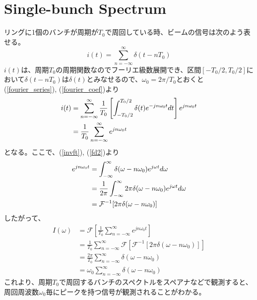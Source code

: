 \documentclass[]{jlreq}
\theoremstyle{definition}
\begin{document}
\section{Single-bunch Spectrum}
リングに1個のバンチが周期が$T_0$で周回している時、ビームの信号は次のよう表せる。
%
\begin{equation}
  i(t) = \sum_{n=-\infty}^{\infty} \delta (t - n T_0 )
\end{equation}
%
$i(t)$は、周期$T_0$の周期関数なのでフーリエ級数展開でき、区間$[-T_0/2, T_0/2]$において$\delta(t- n T_0)$は$\delta(t)$とみなせるので、$\omega_0 = 2\pi/T_0$とおくと(\ref{fourier_series}), (\ref{fourier_coef})より
%
\begin{align}
  i(t) &= \sum_{n = -\infty}^{\infty} \frac{1}{T_0} \left[\int_{-T_0/2}^{T_0/2}\delta (t) e^{-j n \omega_0 t} dt\right] 
  e^{j n \omega_0 t} \notag\\
              &= \frac{1}{T_0} \sum_{n = -\infty}^{\infty} e^{j n \omega_0 t} 
\end{align}
%
となる。ここで、(\ref{invft}), (\ref{fd2})より
%
\begin{align}
  e^{j n \omega_0 t} &=  \int_{-\infty}^{\infty} \delta (\omega - n \omega_0) e^{j \omega t} d\omega \notag\\ 
      &= \frac{1}{2\pi} \int_{-\infty}^{\infty} 2\pi \delta (\omega - n \omega_0) e^{j \omega t} d\omega \\ 
      &= \mathcal{F}^{-1}[2\pi \delta(\omega - n\omega_0)] 
\end{align}
%
したがって、
%
\begin{align}
  I(\omega) &= \mathcal{F}\left[\frac{1}{T_0} \sum_{n = -\infty}^{\infty} e^{j n \omega_0 t}\right] \\ 
      & = \frac{1}{T_0} \sum_{n = -\infty}^{\infty} \mathcal{F}[\mathcal{F}^{-1}[2\pi \delta(\omega - n\omega_0)]] \\ 
      & = \frac{2 \pi}{T_0} \sum_{n = -\infty}^{\infty} \delta(\omega - n\omega_0)\\ 
      &= \omega_0 \sum_{n = -\infty}^{\infty} \delta(\omega - n\omega_0)
\end{align}
%
これより、周期$T_0$で周回するバンチのスペクトルをスペアナなどで観測すると、周回周波数$\omega_0$毎にピークを持つ信号が観測されることがわかる。
%
\end{document}

